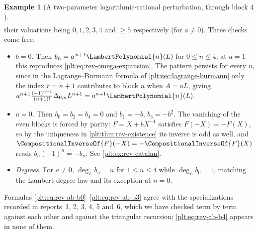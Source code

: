 \documentclass[11pt,oneside]{article}
\theoremstyle{plain}
\theoremstyle{definition}
\newtheorem{example}[theorem]{Example}
\theoremstyle{remark}
\newcommand{\shiftop}[2]{\Delta_{#1,#2}}                 %
\newcommand{\rev}[1]{\CompositionalInverseOf{#1}}
\newcommand{\LamP}[1]{\LambertPolynomial{#1}}
\begin{document}
\begin{example}[A two-parameter logarithmic-rational perturbation, through
block \(4\)]
\begin{align*}
\end{align*}
their valuations being \(0,1,2,3,4\) and \(\ge5\) respectively (for
\(a\ne0\)).  Three checks come free.
\begin{itemize}
\item \emph{\(b=0\).}  Then \(b_n=a^{\,n+1}\LamP{n}(L)\) for \(0\le n\le4\); at
\(a=1\) this reproduces \eqref{plt:eq:rev-omega-expansion}.  The pattern
persists for every \(n\), since in the Lagrange--B\"urmann formula of
\cref{plt:sec:lagrange-burmann} only the index \(r=n+1\) contributes to block
\(n\) when \(A=aL\), giving
\(a^{n+1}\frac{(-1)^{n+1}}{(n+1)!}\shiftop{0}{n}L^{n+1}=a^{n+1}\LamP{n}(L)\).
\item \emph{\(a=0\).}  Then \(b_0=b_2=b_4=0\) and \(b_1=-b\), \(b_3=-b^2\).
The vanishing of the even blocks is forced by parity: \(F=X+bX^{-1}\) satisfies
\(F(-X)=-F(X)\), so by the uniqueness in \cref{plt:thm:rev-existence} its
inverse is odd as well, and \(\rev{F}(-X)=-\rev{F}(X)\) reads
\(b_n(-1)^n=-b_n\).  See \cref{plt:ex:rev-catalan}.
\item \emph{Degrees.}  For \(a\ne0\), \(\deg_Lb_n=n\) for \(1\le n\le4\) while
\(\deg_Lb_0=1\), matching the Lambert degree law and its exception at
\(n=0\).
\end{itemize}
Formulas \eqref{plt:eq:rev-ab-b0}--\eqref{plt:eq:rev-ab-b3} agree with the
specializations recorded in reports~1, 2, 3, 4, 5 and~6, which we have checked
term by term against each other and against the triangular recursion;
\eqref{plt:eq:rev-ab-b4} appears in none of them.
\end{example}
\end{document}
